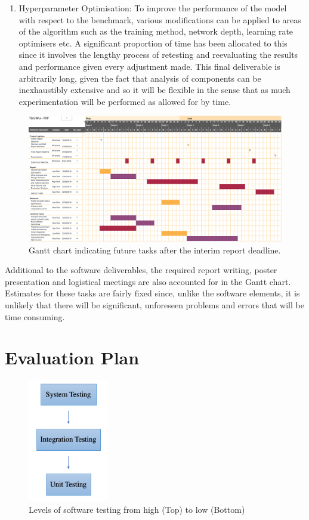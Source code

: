 \documentclass[10pt,onecolumn,letterpaper]{article}
\begin{document}
\begin{enumerate}
	\item Hyperparameter Optimisation: To improve the performance of the model with respect to the benchmark, various modifications can be applied to areas of the algorithm such as the training method, network depth, learning rate optimisers etc. A significant proportion of time has been allocated to this since it involves the lengthy process of retesting and reevaluating the results and performance given every adjustment made. This final deliverable is arbitrarily long, given the fact that analysis of components can be inexhaustibly extensive and so it will be flexible in the sense that as much experimentation will be performed as allowed for by time. 
\end{enumerate}

\begin{figure}[!hbt!]
\centering
\includegraphics[width=17.5cm]{future_gantt.png}
\caption{Gantt chart indicating future tasks after the interim report deadline.}
\end{figure}

Additional to the software deliverables, the required report writing, poster presentation and logistical meetings are also accounted for in the Gantt chart. Estimates for these tasks are fairly fixed since, unlike the software elements, it is unlikely that there will be significant, unforeseen problems and errors that will be time consuming. 

\section{Evaluation Plan} \label{benchmark} 

\begin{figure}[!hbt!]
\centering
\includegraphics[width=3.5cm]{evaluation.png}
\caption{Levels of software testing from high (Top) to low (Bottom)}
\end{figure}
\end{document}
